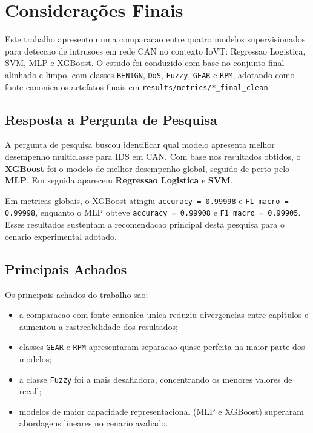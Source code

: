 \chapter{Considerações Finais}

Este trabalho apresentou uma comparacao entre quatro modelos supervisionados para deteccao de intrusoes em rede CAN no contexto IoVT: Regressao Logistica, SVM, MLP e XGBoost. O estudo foi conduzido com base no conjunto final alinhado e limpo, com classes \texttt{BENIGN}, \texttt{DoS}, \texttt{Fuzzy}, \texttt{GEAR} e \texttt{RPM}, adotando como fonte canonica os artefatos finais em \texttt{results/metrics/*\_final\_clean}.

\section{Resposta a Pergunta de Pesquisa}

A pergunta de pesquisa buscou identificar qual modelo apresenta melhor desempenho multiclasse para IDS em CAN. Com base nos resultados obtidos, o \textbf{XGBoost} foi o modelo de melhor desempenho global, seguido de perto pelo \textbf{MLP}. Em seguida aparecem \textbf{Regressao Logistica} e \textbf{SVM}.

Em metricas globais, o XGBoost atingiu \texttt{accuracy = 0.99998} e \texttt{F1 macro = 0.99998}, enquanto o MLP obteve \texttt{accuracy = 0.99908} e \texttt{F1 macro = 0.99905}. Esses resultados sustentam a recomendacao principal desta pesquisa para o cenario experimental adotado.

\section{Principais Achados}

Os principais achados do trabalho sao:

\begin{itemize}
	\item a comparacao com fonte canonica unica reduziu divergencias entre capitulos e aumentou a rastreabilidade dos resultados;
	\item classes \texttt{GEAR} e \texttt{RPM} apresentaram separacao quase perfeita na maior parte dos modelos;
	\item a classe \texttt{Fuzzy} foi a mais desafiadora, concentrando os menores valores de recall;
	\item modelos de maior capacidade representacional (MLP e XGBoost) superaram abordagens lineares no cenario avaliado.
\end{itemize}

